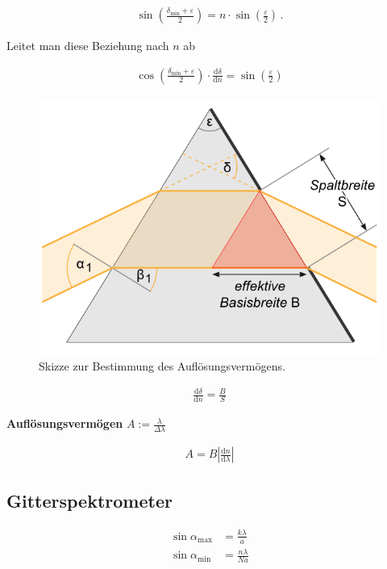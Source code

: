 \documentclass[12pt,a4paper,titlepage,headinclude,bibtotoc]{scrartcl}
\newcommand{\dif}{\ensuremath{\mathrm{d}}}
\begin{document}
\begin{align}
	\sin\left(\frac{\delta_\text{min}+\varepsilon}{2}\right)=n\cdot\sin\left(\frac{\varepsilon}{2}\right)\,.
\end{align}

Leitet man diese Beziehung nach $n$ ab

\begin{align}
	\cos\left(\frac{\delta_\text{min}+\varepsilon}{2}\right)\cdot \frac{\dif \delta}{\dif n}=\sin\left(\frac{\varepsilon}{2}\right)
\end{align}

\begin{figure}[!h]
	\centering
	\includegraphics[scale=0.6]{Prisma2.png}
	\caption{Skizze zur Bestimmung des Auflösungsvermögens. \cite[Datum: 28.12.2014]{LP19}}
	\label{fig:prisma2}
\end{figure}

\begin{align}
	\frac{\dif \delta}{\dif n}=\frac{B}{S}
\end{align}

\textbf{Auflösungsvermögen} $A:=\frac{\lambda}{\Delta\lambda}$

\begin{align}
	A=B\left|\frac{\dif n}{\dif \lambda}\right|
\end{align}

\subsection{Gitterspektrometer}
\begin{align}
	\sin\alpha_\text{max}&=\frac{k\lambda}{a}\\
	\sin\alpha_\text{min}&=\frac{n\lambda}{Na}
\end{align}
\end{document}
